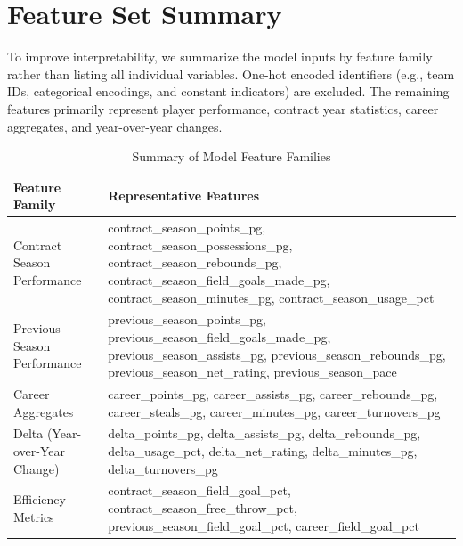 \documentclass[conference]{IEEEtran}
\begin{document}
\section{Feature Set Summary}

To improve interpretability, we summarize the model inputs by feature family rather than listing all individual variables. One-hot encoded identifiers (e.g., team IDs, categorical encodings, and constant indicators) are excluded. The remaining features primarily represent player performance, contract year statistics, career aggregates, and year-over-year changes.

\begin{table}[ht]
    \centering
    \caption{Summary of Model Feature Families}
    \begin{tabular}{p{4cm} p{10cm}}
        \toprule
        Feature Family                      & Representative Features                                                                                                                                                      \\
        \midrule

        Contract Season Performance         &
        contract\_season\_points\_pg, contract\_season\_possessions\_pg, contract\_season\_rebounds\_pg, contract\_season\_field\_goals\_made\_pg, contract\_season\_minutes\_pg, contract\_season\_usage\_pct             \\

        Previous Season Performance         &
        previous\_season\_points\_pg, previous\_season\_field\_goals\_made\_pg, previous\_season\_assists\_pg, previous\_season\_rebounds\_pg, previous\_season\_net\_rating, previous\_season\_pace                       \\

        Career Aggregates                   &
        career\_points\_pg, career\_assists\_pg, career\_rebounds\_pg, career\_steals\_pg, career\_minutes\_pg, career\_turnovers\_pg                                                                                      \\

        Delta (Year-over-Year Change)       &
        delta\_points\_pg, delta\_assists\_pg, delta\_rebounds\_pg, delta\_usage\_pct, delta\_net\_rating, delta\_minutes\_pg, delta\_turnovers\_pg                                                                        \\

        Efficiency Metrics                  &
        contract\_season\_field\_goal\_pct, contract\_season\_free\_throw\_pct, previous\_season\_field\_goal\_pct, career\_field\_goal\_pct                                                                               \\


\end{tabular}
\end{table}
\end{document}
